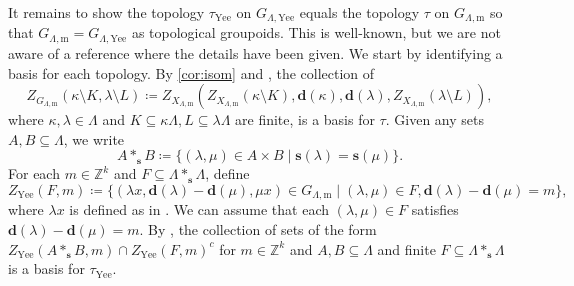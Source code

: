 \documentclass[11pt]{amsart}
\theoremstyle{definition}
\numberwithin{thm}{section}
\numberwithin{equation}{section}
\newcommand{\setof}[2]{\{ #1 \mid #2 \}}
\newcommand{\compl}[1]{#1^c}
\newcommand{\Z}{\mathbb{Z}}
\newcommand{\source}{\mathbf{s}}
\newcommand{\degree}{\mathbf{d}}
\newcommand{\ofYeend}{\mathrm{Yee}}
\newcommand{\M}{\mathrm{m}}
\newcommand{\PS}[2]{X_{#2, #1}}
\newcommand{\PG}[2]{{G_{#2, #1}}}
\newcommand{\SDPGcylinder}[5]{Z_{#1}(#2,#3,#4,#5)}
\newcommand{\Fell}[3]{Z_{#1}\left(#2 \setminus #3\right)}
\newcommand{\Fellgpd}[5]{Z_{#1}\left(#2 \setminus #3, #4 \setminus #5\right)}
\begin{document}
It remains to show the topology $\tau_\ofYeend$ on $\PG{\ofYeend}{\Lambda}$ equals the topology $\tau$ on $\PG{\M}{\Lambda}$ so that $\PG{\M}{\Lambda} = \PG{\ofYeend}{\Lambda}$ as topological groupoids. 
This is well-known, but we are not aware of a reference where the details have been given.
We start by identifying a basis for each topology.
By \cref{cor:isom} and \cite[Lemma 6.3]{Jon26}, the collection of 
\[
\Fellgpd{\PG{\M}{\Lambda}}{\kappa}{K}{\lambda}{L} \coloneqq 
\SDPGcylinder{\PS{\M}{\Lambda}}{
\Fell{\PS{\M}{\Lambda}}{\kappa}{K}
}{
\degree(\kappa)
}{
\degree(\lambda)
}{
\Fell{\PS{\M}{\Lambda}}{\lambda}{L}
},
\]
where $\kappa, \lambda \in \Lambda$ and $K \subseteq \kappa\Lambda, L \subseteq \lambda\Lambda$ are finite, is a basis for $\tau$.
Given any sets $A, B \subseteq \Lambda$, we write 
\[
A *_{\source} B \coloneqq 
\setof{
(\lambda, \mu) \in A \times B
}{
\source(\lambda) = \source(\mu)
}.
\]
For each $m \in \Z^k$ and $F \subseteq \Lambda *_{\source} \Lambda$, define
\[
Z_\ofYeend(F, m) \coloneqq 
\setof{
(\lambda x, \degree(\lambda) - \degree(\mu), \mu x) \in \PG{\M}{\Lambda}
}{
(\lambda, \mu) \in F, \degree(\lambda) - \degree(\mu) = m
},
\]
where $\lambda x$ is defined as in \cite[Lemma 3.3]{Yee07}. 
We can assume that each $(\lambda, \mu) \in F$ satisfies $\degree(\lambda) - \degree(\mu) = m$.
By \cite[Proposition 3.6]{Yee07}, the collection of sets of the form 
\(
Z_\ofYeend(A *_{\source} B, m) \cap \compl{Z_\ofYeend(F, m)}
\)
for $m \in \Z^k$ and $A, B \subseteq \Lambda$ and finite $F \subseteq \Lambda *_{\source} \Lambda$ is a basis for $\tau_\ofYeend$.
\end{document}
